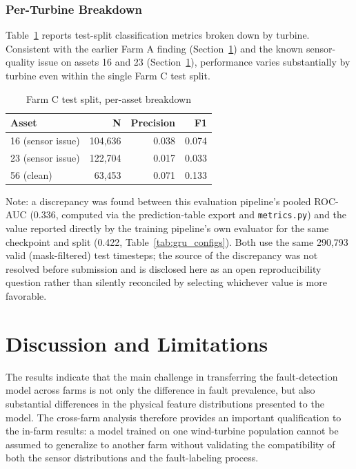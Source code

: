 \documentclass[conference]{IEEEtran}
\begin{document}
\subsubsection{Per-Turbine Breakdown}
 
Table~\ref{tab:per_asset} reports test-split classification metrics
broken down by turbine. Consistent with the earlier Farm A finding
(Section~\ref{sec:discussion}) and the known sensor-quality issue on
assets 16 and 23 (Section~\ref{sec:discussion}), performance varies
substantially by turbine even within the single Farm C test split.
 
\begin{table}[t]
\caption{Farm C test split, per-asset breakdown}
\label{tab:per_asset}
\centering
\begin{tabular}{@{}lrrr@{}}
\toprule
Asset & N & Precision & F1 \\
\midrule
16 (sensor issue) & 104{,}636 & 0.038 & 0.074 \\
23 (sensor issue) & 122{,}704 & 0.017 & 0.033 \\
56 (clean)        & 63{,}453  & 0.071 & 0.133 \\
\bottomrule
\end{tabular}
\end{table}
 
Note: a discrepancy was found between this evaluation pipeline's pooled
ROC-AUC (0.336, computed via the prediction-table export and
\texttt{metrics.py}) and the value reported directly by the training
pipeline's own evaluator for the same checkpoint and split (0.422,
Table~\ref{tab:gru_configs}). Both use the same 290{,}793 valid
(mask-filtered) test timesteps; the source of the discrepancy was not
resolved before submission and is disclosed here as an open
reproducibility question rather than silently reconciled by selecting
whichever value is more favorable.
\section{Discussion and Limitations}
\label{sec:discussion}

The results indicate that the main challenge in transferring the fault-detection
model across farms is not only the difference in fault prevalence, but also
substantial differences in the physical feature distributions presented to the
model. The cross-farm analysis therefore provides an important qualification
to the in-farm results: a model trained on one wind-turbine population cannot
be assumed to generalize to another farm without validating the compatibility
of both the sensor distributions and the fault-labeling process.
\end{document}
